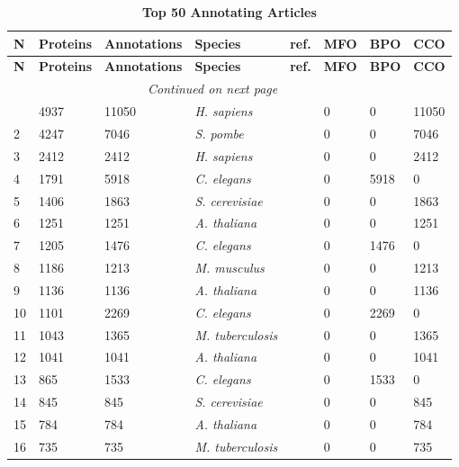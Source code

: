 \begin{longtable}[!ht]{|l|l|l|l|l|l|l|l|}
\caption{\textbf{Top 50 Annotating Articles}} \\
\hline
\textbf{N}&\textbf{Proteins}&\textbf{Annotations}&\textbf{Species}&
\textbf{ref.}&
\textbf{MFO}& \textbf{BPO}&\textbf{CCO}\\\hline
\endfirsthead
\hline
\textbf{N}&\textbf{Proteins}&\textbf{Annotations}&\textbf{Species}&
\textbf{ref.} &
\textbf{MFO}&\textbf{BPO}&\textbf{CCO} \\\hline
\endhead
\hline \multicolumn{4}{r}{\textit{Continued on next page}} \\
\endfoot
\hline
\endlastfoot
1 & 4937 & 11050 & \textit{H. sapiens} & \cite{pmid18029348} & 0 & 0 & 11050\\ \hline
2 & 4247 & 7046 & \textit{S. pombe} & \cite{pmid16823372} & 0 & 0 & 7046\\ \hline
3 & 2412 & 2412 & \textit{H. sapiens} & \cite{pmid18614015} & 0 & 0 & 2412\\ \hline
4 & 1791 & 5918 & \textit{C. elegans} & \cite{pmid14551910} & 0 & 5918 & 0\\ \hline
5 & 1406 & 1863 & \textit{S. cerevisiae} & \cite{pmid14562095} & 0 & 0 & 1863\\ \hline
6 & 1251 & 1251 & \textit{A. thaliana} & \cite{pmid18431481} & 0 & 0 & 1251\\ \hline
7 & 1205 & 1476 & \textit{C. elegans} & \cite{pmid15791247} & 0 & 1476 & 0\\ \hline
8 & 1186 & 1213 & \textit{M. musculus} & \cite{pmid14651853} & 0 & 0 & 1213\\ \hline
9 & 1136 & 1136 & \textit{A. thaliana} & \cite{pmid17317660} & 0 & 0 & 1136\\ \hline
10 & 1101 & 2269 & \textit{C. elegans} & \cite{pmid12529635} & 0 & 2269 & 0\\ \hline
11 & 1043 & 1365 & \textit{M. tuberculosis} & \cite{pmid15525680} & 0 & 0 & 1365\\ \hline
12 & 1041 & 1041 & \textit{A. thaliana} & \cite{pmid21166475} & 0 & 0 & 1041\\ \hline
13 & 865 & 1533 & \textit{C. elegans} & \cite{pmid15489339} & 0 & 1533 & 0\\ \hline
14 & 845 & 845 & \textit{S. cerevisiae} & \cite{pmid16823961} & 0 & 0 & 845\\ \hline
15 & 784 & 784 & \textit{A. thaliana} & \cite{pmid21533090} & 0 & 0 & 784\\ \hline
16 & 735 & 735 & \textit{M. tuberculosis} & \cite{pmid14532352} & 0 & 0 & 735\\ \hline

\end{longtable}
